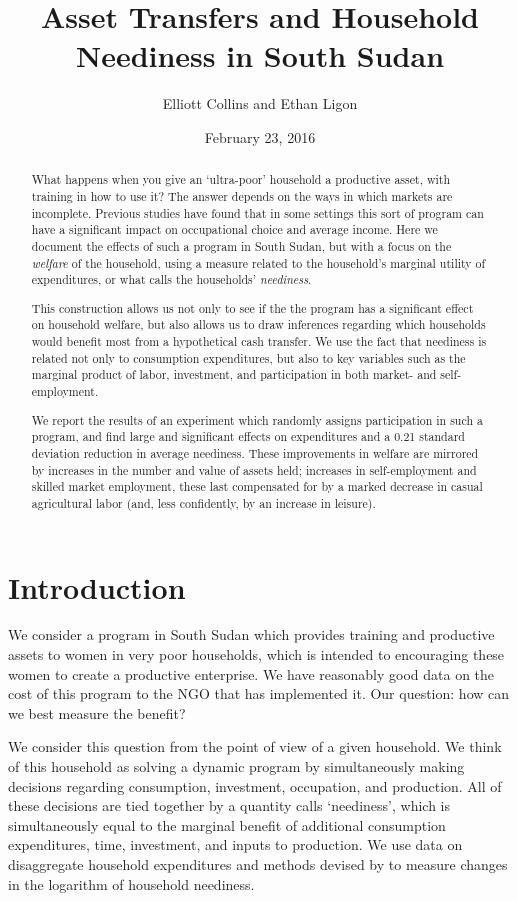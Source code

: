 \documentclass[12pt,letterpaper]{article}
\author{Elliott Collins and Ethan Ligon}
\date{February 23, 2016}
\title{Asset Transfers and Household Neediness in South Sudan}
\begin{document}
\maketitle

\begin{abstract}
What happens when you give an `ultra-poor' household a productive
asset, with training in how to use it?  The answer depends on the
ways in which markets are incomplete.  Previous studies have found
that in some settings this sort of program can have a significant
impact on occupational choice and average income.  Here we document
the effects of such a program in South Sudan, but with a focus on
the \emph{welfare} of the household, using a measure related to the
household's marginal utility of expenditures, or what \cite{Ligon15}
calls the households' \emph{neediness}.

This construction allows us not only to see if the the program has a
significant effect on household welfare, but also allows us to draw
inferences regarding which households would benefit most from a
hypothetical cash transfer.  We use the fact that neediness is
related not only to consumption expenditures, but also to key
variables such as the marginal product of labor, investment, and
participation in both market- and self-employment.

We report the results of an experiment which randomly assigns
participation in such a program, and find large and significant
effects on expenditures and a 0.21 standard deviation reduction in
average neediness.  These improvements in welfare are mirrored by
increases in the number and value of assets held; increases in
self-employment and skilled market employment, these last
compensated for by a marked decrease in casual agricultural labor
(and, less confidently, by an increase in leisure).
\end{abstract}

\section{Introduction}
\label{sec:orgheadline1}
We consider a program in South Sudan which provides training and
productive assets to women in very poor households, which is
intended to encouraging these women to create a productive
enterprise.  We have reasonably good data on the cost of this
program to the NGO that has implemented it.  Our question: how can
we best measure the benefit?

We consider this question from the point of view of a given
household.  We think of this household as solving a dynamic program
by simultaneously making decisions regarding consumption,
investment, occupation, and production.  All of these decisions are
tied together by a quantity \cite{Ligon15} calls `neediness', which
is simultaneously equal to the marginal benefit of additional
consumption expenditures, time, investment, and inputs to
production.  We use data on disaggregate household expenditures and
methods devised by \cite{Ligon15} to measure changes in the
logarithm of household neediness.
\end{document}
